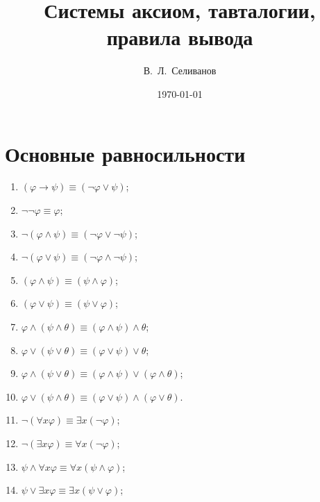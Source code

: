 \documentclass[a4paper,11pt]{article}
\title{Системы аксиом, тавталогии, правила вывода}
\date{\today}
\author{В.~Л.~Селиванов}
\begin{document}
 \maketitle

\section{Основные равносильности}

\begin{enumerate}
\item $(\varphi\rightarrow\psi)\equiv(\neg\varphi\lor\psi)$; 

\item $\neg\neg\varphi\equiv
\varphi$;

\item $\neg (\varphi \land \psi)\equiv (\neg\varphi\lor \neg\psi)$;

\item $\neg(\varphi \lor \psi) \equiv(\neg\varphi \land \neg\psi)$;

\item $(\varphi\land\psi) \equiv(\psi \land \varphi)$; 

\item $(\varphi
\lor \psi)
\equiv(\psi \lor \varphi)$;

\item $\varphi\land(\psi\land\theta)\equiv(\varphi\land\psi)\land\theta$;

\item $\varphi\lor (\psi\lor \theta) \equiv(\varphi \lor \psi) \lor \theta$;

\item $\varphi\land(\psi\lor\theta)\equiv(\varphi\land\psi)\lor(\varphi\land
\theta)$; 

\item $\varphi\lor(\psi\land\theta)\equiv(\varphi\lor\psi)\land(\varphi
\lor\theta)$.
\vspace{10mm}

\item $\neg(\forall x \varphi)\equiv \exists x (\neg\varphi)$; 

\item $\neg (\exists x \varphi)\equiv \forall x
(\neg\varphi)$;

\item $\psi \land \forall x \varphi\equiv \forall x (\psi\land
\varphi)$; 

\item $\psi\lor \exists x \varphi \equiv
\exists x (\psi \lor \varphi)$;


\end{enumerate}
\end{document}
